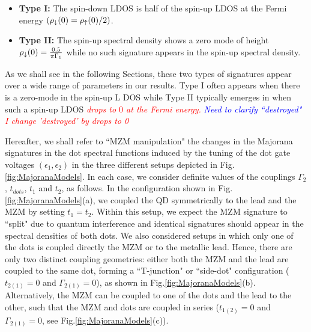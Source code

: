 \documentclass[showpacs,aps,prb,reprint,superscriptaddress]{revtex4-2}
\newcommand{\LUIS}[1]{\textcolor{blue}{\fbox{Luis} {\sl#1}}}
\newcommand{\Jesus}[1]{\textcolor{red}{\fbox{Jesus} {\sl#1}}}
\newcommand{\change}[1]{\textcolor{red}{\sl#1}}
\begin{document}
 \begin{itemize}
         \item \textbf{Type I: }  The spin-down LDOS is half of the spin-up LDOS  at the Fermi energy $(\rho_\downarrow(0)=\rho_\uparrow(0)/2)$. 
         \item \textbf{Type II: } The spin-up spectral density shows a zero mode of height $ \rho_\downarrow(0) = \frac{0.5}{\pi  \Gamma_1}$ while no such signature appears in the spin-up spectral density. 
     \end{itemize}
     
As we shall see in the following Sections, these two types of signatures appear over a wide range of parameters in our results. Type I often appears when there is a zero-mode in the spin-up L  DOS while Type II typically emerges in when such a spin-up LDOS \change{drops to $0$ at the Fermi energy.} \LUIS{Need to clarify ``destroyed"}\Jesus{I change 'destroyed' by drops to 0}

Hereafter, we shall refer to ``MZM manipulation" the changes in the Majorana signatures in the dot spectral functions induced by the tuning of the dot gate voltages $( \epsilon_1 , \epsilon_2 )$ in the three different setups depicted in Fig.\ref{fig:MajoranaModels}. In each case, we consider definite values of the couplings $\Gamma_2$, $t_{dots}$, $t_1$ and $t_2$, as follows.  In the configuration shown in Fig.\ref{fig:MajoranaModels}(a), we coupled the QD symmetrically to the lead and the MZM by setting $t_1\!=\! t_2$.  Within this setup, we expect the MZM signature to ``split" due to quantum interference and identical signatures should appear in the spectral densities of both dots. We also considered setups in which only one of the dots is coupled directly the MZM or to the metallic lead. Hence, there are only two distinct coupling geometries: either both the MZM and the lead are coupled to the same dot, forming a ``T-junction" or ``side-dot" configuration ($t_{2(1)}\!=\!0$ and $\Gamma_{2(1)}\!=\!0$), as shown in Fig.\ref{fig:MajoranaModels}(b). Alternatively, the MZM can be coupled to one of the dots and the lead to the other, such that the MZM and dots are coupled in series ($t_{1(2)}\!=\!0$ and $\Gamma_{2(1)}\!=\!0$, see Fig.\ref{fig:MajoranaModels}(c)).
\end{document}
